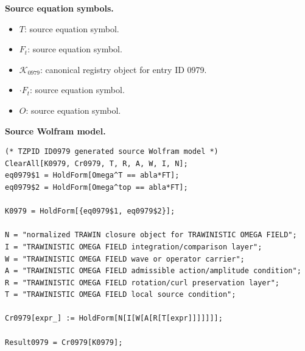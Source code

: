\begin{minipage}[t]{0.49\linewidth}
\begingroup
\small
\raggedright
\textbf{Source equation symbols.}\par
\begin{itemize}[leftmargin=1.35em,itemsep=1pt,topsep=1pt,parsep=0pt]
    \item $T$: source equation symbol.
    \item $F_{t}$: source equation symbol.
    \item $\mathcal{K}_{0979}$: canonical registry object for entry ID 0979.
    \item $\cdot F_{t}$: source equation symbol.
    \item $O$: source equation symbol.
\end{itemize}
\endgroup
\end{minipage}\hfill
\begin{minipage}[t]{0.47\linewidth}
\begingroup
\scriptsize
\raggedright
\textbf{Source Wolfram model.}\par
\begin{Verbatim}[fontsize=\tiny,breaklines=true,breakanywhere=true]
(* TZPID ID0979 generated source Wolfram model *)
ClearAll[K0979, Cr0979, T, R, A, W, I, N];
eq0979$1 = HoldForm[Omega^T == abla*FT];
eq0979$2 = HoldForm[Omega^top == abla*FT];

K0979 = HoldForm[{eq0979$1, eq0979$2}];

N = "normalized TRAWIN closure object for TRAWINISTIC OMEGA FIELD";
I = "TRAWINISTIC OMEGA FIELD integration/comparison layer";
W = "TRAWINISTIC OMEGA FIELD wave or operator carrier";
A = "TRAWINISTIC OMEGA FIELD admissible action/amplitude condition";
R = "TRAWINISTIC OMEGA FIELD rotation/curl preservation layer";
T = "TRAWINISTIC OMEGA FIELD local source condition";

Cr0979[expr_] := HoldForm[N[I[W[A[R[T[expr]]]]]]];

Result0979 = Cr0979[K0979];
\end{Verbatim}
\endgroup
\end{minipage}

